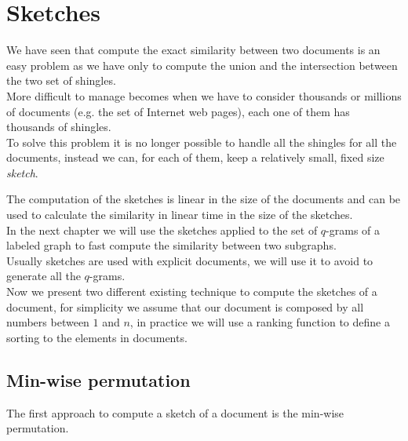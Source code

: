 
\section{Sketches}

We have seen that compute the exact similarity between two documents is an easy problem
as we have only to compute the union and the intersection between the two set of shingles.\\

More difficult to manage becomes when we have to consider thousands or millions of documents
(e.g. the set of Internet web pages), each one of them has thousands of shingles.\\

To solve this problem it is no longer possible to handle all the shingles for all the documents, 
instead we can, for each of them, keep a relatively small, fixed size \textit{sketch}\cite{Broder2000}.

The computation of the sketches is linear in the size of the documents and can be used to calculate
the similarity in linear time in the size of the sketches.\\

In the next chapter we will use the sketches applied to the set of $q$-grams of a labeled graph to 
fast compute the similarity between two subgraphs.\\

Usually sketches are used with explicit documents, we will use it to avoid to generate all the $q$-grams.\\

Now we present two different existing technique to compute the sketches of a document, 
for simplicity we assume that our document is composed by all numbers between $1$ and $n$, 
in practice we will use a ranking function to define a sorting to the elements in documents.

\subsection*{Min-wise permutation}

The first approach to compute a sketch of a document is the min-wise permutation\cite{Broder:1998:MIP:276698.276781}.\\

